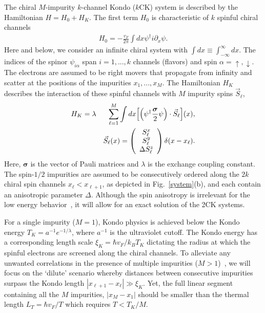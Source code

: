 \documentclass[aps,prb,twocolumn,superscriptaddress]{revtex4-1}
\begin{document}
The chiral $M$-impurity $k$-channel Kondo ($k$CK) system is described by the Hamiltonian $H=H_{0}+H_{K}$. The first term $H_{0}$ is characteristic of $k$ spinful chiral channels
\begin{eqnarray}
H_{0} = -\frac{v_{F}}{2\pi}\int{dx}\psi^{\dagger}i\partial_{x}\psi. \label{eqn:H0}
\end{eqnarray}
Here and below, we consider an infinite chiral system with $\int dx \equiv \int_{-\infty}^\infty dx$. The indices of the spinor $\psi_{i\alpha}$ span $i=1,...,k$ channels (flavors) and spin $\alpha=\uparrow,\downarrow$. The electrons are assumed to be right movers that propagate from infinity and scatter at the positions of the impurities ${x_{1},...,x_{M}}$. The Hamiltonian $H_{K}$ describes the interaction of these spinful channels with $M$ impurity spins $\vec{S}_{\ell}$,
\begin{eqnarray}
H_{K} = \lambda&&\sum_{\ell=1}^{M}\int{dx}\Bigl[\Bigl(\psi^{\dagger}\frac{\bm{\sigma}}{2}\psi\Bigr)\cdot\vec{S}_{\ell}\Bigr](x), \label{eqn:HK} \\
&&\vec{S}_{\ell}(x)=\left( \begin{array}{c} S_{\ell}^{x} \\ S_{\ell}^{y} \\ \Delta S_{\ell}^{z} \end{array} \right)\delta(x-x_{\ell}). \nonumber 
\end{eqnarray}
Here, $\bm{\sigma}$ is the vector of Pauli matrices and $\lambda$ is the exchange coupling constant. The spin-$1/2$ impurities are assumed to be consecutively ordered along the $2k$ chiral spin channels $x_{\ell}<x_{\ell+1}$, as depicted in Fig.~\ref{system}(b), and each contain an anisotropic parameter $\Delta$. Although the spin anisotropy is irrelevant for the low energy behavior~\cite{emery1992mapping}, it will allow for an exact solution of the 2CK systems. 

For a single impurity ($M=1$), Kondo physics is achieved below the Kondo energy $T_{K}=a^{-1} e^{-1/\lambda}$, where $a^{-1}$ is the ultraviolet cutoff. The Kondo energy has a corresponding length scale $\xi_{K}=\hbar v_{F}/k_{B}T_{K}$ dictating the radius at which the spinful electrons are screened along the chiral channels. To alleviate any unwanted correlations in the presence of multiple impurities ($M>1$)~\cite{inPrepLotem}, we will focus on the `dilute' scenario whereby distances between consecutive impurities surpass the Kondo length $|x_{\ell+1}-x_{\ell}|\gg\xi_{K}$. %
Yet, the full linear segment containing all the $M$ impurities, $|x_M-x_1|$ should be smaller than the thermal length $L_T = \hbar v_F/T$ which requires $T < T_K/M$.
\end{document}
